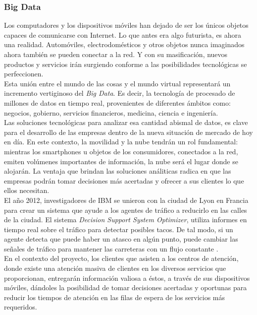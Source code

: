 \subsubsection{Big Data}

Los computadores y los dispositivos móviles han dejado de ser los únicos objetos capaces de comunicarse con Internet. Lo que antes era algo futurista, es ahora una realidad. Automóviles, electrodomésticos y otros objetos nunca imaginados ahora también se pueden conectar a la red. Y con su masificación, nuevos productos y servicios irán surgiendo conforme a las posibilidades tecnológicas se perfeccionen.\\

Esta unión entre el mundo de las cosas y el mundo virtual representará un incremento vertiginoso del \textit{Big Data}. Es decir, la tecnología de procesado de millones de datos en tiempo real, provenientes de diferentes ámbitos como: negocios, gobierno, servicios financieros, medicina, ciencia e ingeniería.\\

Las soluciones tecnológicas para analizar esa cantidad abismal de datos, es clave para el desarrollo de las empresas dentro de la nueva situación de mercado de hoy en día. En este contexto, la movilidad y la nube tendrán un rol fundamental: mientras los smartphones u objetos de los consumidores, conectados a la red, emiten volúmenes importantes de información, la nube será el lugar donde se alojarán. La ventaja que brindan las soluciones análiticas radica en que las empresas podrán tomar decisiones más acertadas y ofrecer a sus clientes lo que ellos necesitan.\\

El año 2012, investigadores de IBM se unieron con la ciudad de Lyon en Francia para crear un sistema que ayude a los agentes de tráfico a reducirlo en las calles de la ciudad. El sistema \textit{Decision Support System Optimizer}, utiliza informes en tiempo real sobre el tráfico para detectar posibles tacos. De tal modo, si un agente detecta que puede haber un atasco en algún punto, puede cambiar las señales de tráfico para mantener las carreteras con un flujo constante \cite{IBM12}.\\

En el contexto del proyecto, los clientes que asisten a los centros de atención, donde existe una atención masiva de clientes en los diversos servicios que proporcionan, entregarán información valiosa a éstos, a través de sus dispositivos móviles, dándoles la posibilidad de tomar decisiones acertadas y oportunas para reducir los tiempos de atención en las filas de espera de los servicios más requeridos.\\

